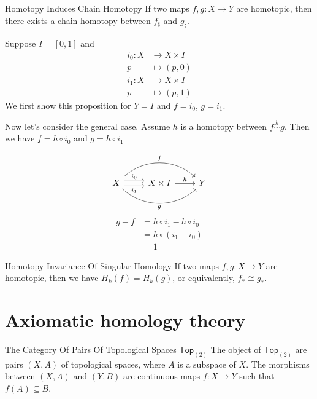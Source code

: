 \documentclass{report}
\begin{document}
\begin{proposition}{Homotopy Induces Chain Homotopy}{}
	If two maps $f,g :X\to Y$ are homotopic, then there exists a chain homotopy between $f_\sharp$ and $g_\sharp$.
\end{proposition}

\begin{prf}
	Suppose $I=[0,1]$ and
	\begin{align*}
		i_0: X & \longrightarrow X\times I \\
		p      & \longmapsto (p,0)
	\end{align*}
	\begin{align*}
		i_1: X & \longrightarrow X\times I \\
		p      & \longmapsto (p,1)
	\end{align*}
	We first show this proposition for $Y=I$ and $f=i_0$, $g=i_1$.


	Now let's consider the general case. Assume $h$ is a homotopy between $f\overset{h}{\sim} g$. Then we have $f=h\circ i_0$ and $g=h\circ i_1$

	\begin{equation*}
		\begin{tikzcd}[ampersand replacement=\&]
			X \arrow[r, shift left=1.2, "i_0"]\arrow[r,shift right=1.2,"i_1"']  \arrow[rr, bend left=42, "f"{ above}] \arrow[rr, bend right=42, "g"{below}]
			\& X\times I \arrow[r, "h"] \& Y
		\end{tikzcd}
	\end{equation*}
	\[
		\begin{aligned}
			g-f & = h\circ i_1 - h\circ i_0 \\
			    & = h\circ (i_1-i_0)        \\
			    & = 1
		\end{aligned}
	\]
\end{prf}


\begin{proposition}{Homotopy Invariance Of Singular Homology}{}
	If two maps $f,g :X\to Y$ are homotopic, then we have $H_k(f)=H_k(g)$, or equivalently, $f_*\cong g_*$.
\end{proposition}


\section{Axiomatic homology theory}
\begin{definition}{The Category Of Pairs Of Topological Spaces $\mathsf{Top}_{(2)}$}{}
	The object of $\mathsf{Top}_{(2)}$ are pairs $(X, A)$ of topological spaces, where $A$ is a subspace of $X$. The morphisms between $(X, A)$ and $(Y, B)$ are continuous maps $f:X\to Y$ such that $f(A)\subseteq B$.
\end{definition}
\end{document}
